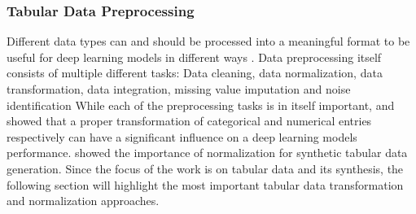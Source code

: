 


\subsubsection{Tabular Data Preprocessing}
\label{sec:preprocessing}

Different data types can and should be processed into a meaningful format to be useful for deep learning models in different ways \cite{fan2020RelationalDataSynthesisa, lederrey2022DATGANIntegratingExperta}.
Data preprocessing itself consists of multiple different tasks: Data cleaning, data normalization, data transformation, data integration, missing value imputation and noise identification \cite{tritscher2020EvaluationPosthocXAIa}
While each of the preprocessing tasks is in itself important, 
\cite{norris2012EvaluatingImpactCategorical} and \cite{gorishniy2022EmbeddingsNumericalFeatures} showed that a proper transformation of categorical and numerical entries respectively can have a significant influence on a deep learning models performance.
\cite{xu2019ModelingTabularData} showed the importance of normalization for synthetic tabular data generation.
Since the focus of the work is on tabular data and its synthesis, the following section will highlight the most important tabular data transformation and normalization approaches.

